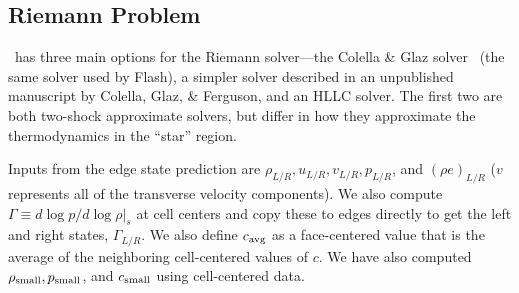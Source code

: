 \subsection{Riemann Problem}

\castro\ has three main options for the Riemann solver---the
Colella \& Glaz solver~\cite{colglaz} (the same solver used
by Flash), a simpler solver described in an unpublished
manuscript by Colella, Glaz, \& Ferguson, and an HLLC
solver.  The first two are both
two-shock approximate solvers, but differ in how they approximate
the thermodynamics in the ``star'' region.  

Inputs from the edge state prediction are $\rho_{L/R}, u_{L/R},
v_{L/R}, p_{L/R}$, and $(\rho e)_{L/R}$ ($v$ represents all of the
transverse velocity components).  We also compute $\Gamma \equiv d\log
p / d\log \rho |_s$ at cell centers and copy these to edges directly
to get the left and right states, $\Gamma_{L/R}$.  We also define
$c_{\rm avg}$ as a face-centered value that is the average of the
neighboring cell-centered values of $c$.  We have also computed
$\rho_{\rm small}, p_{\rm small}$, and $c_{\rm small}$ using
cell-centered data.

